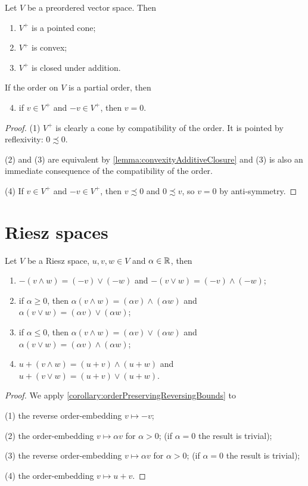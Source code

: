 \begin{lemma}
Let $V$ be a preordered vector space. Then
\begin{enumerate}
\item $V^+$ is a pointed cone;
\item $V^+$ is convex;
\item $V^+$ is closed under addition.
\end{enumerate}
If the order on $V$ is a partial order, then
\begin{enumerate} \setcounter{enumi}{3}
\item if $v\in V^+$ and $-v\in V^+$, then $v = 0$.
\end{enumerate}
\end{lemma}
\begin{proof}
(1) $V^+$ is clearly a cone by compatibility of the order. It is pointed by reflexivity: $0\precsim 0$.

(2) and (3) are equivalent by \ref{lemma:convexityAdditiveClosure} and (3) is also an immediate consequence of the compatibility of the order.

(4) If $v\in V^+$ and $-v\in V^+$, then $v\precsim 0$ and $0\precsim v$, so $v=0$ by anti-symmetry.
\end{proof}

\section{Riesz spaces}

\begin{lemma}
Let $V$ be a Riesz space, $u,v,w\in V$ and $\alpha\in \mathbb{R}$, then
\begin{enumerate}
\item $-(v \wedge w) = (-v)\vee (-w)$ and $-(v \vee w) = (-v)\wedge (-w)$;
\item if $\alpha \geq 0$, then $\alpha(v \wedge w) = (\alpha v)\wedge (\alpha w)$ and $\alpha(v \vee w) = (\alpha v)\vee (\alpha w)$;
\item if $\alpha \leq 0$, then $\alpha(v \wedge w) = (\alpha v)\vee (\alpha w)$ and $\alpha(v \vee w) = (\alpha v)\wedge (\alpha w)$;
\item $u+(v \wedge w) = (u+v)\wedge (u+w)$ and $u+(v \vee w) = (u+v)\vee (u+w)$.
\end{enumerate}
\end{lemma}
\begin{proof}
We apply \ref{corollary:orderPreservingReversingBounds} to

(1) the reverse order-embedding $v\mapsto -v$;

(2) the order-embedding $v\mapsto \alpha v$ for $\alpha > 0$; (if $\alpha = 0$ the result is trivial);

(3) the reverse order-embedding $v\mapsto \alpha v$ for $\alpha > 0$; (if $\alpha = 0$ the result is trivial);

(4) the order-embedding $v\mapsto u+v$.
\end{proof}

